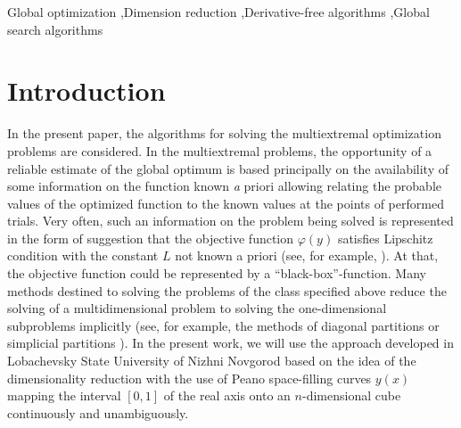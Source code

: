 \documentclass[3p,times,procedia]{elsarticle}
\begin{document}
\begin{frontmatter}
\begin{keyword}
Global optimization \sep Dimension reduction \sep Derivative-free algorithms \sep Global search algorithms




\end{keyword}
\end{frontmatter}





\section{Introduction}
\label{sec:intro}
In the present paper, the algorithms for solving the multiextremal optimization problems
are considered. In the multiextremal problems, the opportunity of a reliable estimate of the global
optimum is based principally on the availability of some information on the function known
{\textit a priori} allowing relating the probable values of the optimized function to the known
values at the points of performed trials. Very often, such an information on the problem being
solved is represented in the form of suggestion that the objective function $\varphi(y)$ satisfies
Lipschitz condition with the constant $L$ not known a priori (see, for example,
\cite{Jones2009,Gablonsky2001,Evtushenko2013}). At that, the objective function could be represented by a ``black-box''-function.
Many methods destined to solving the problems of the class specified above reduce the solving
of a multidimensional problem to solving the one-dimensional subproblems implicitly (see, for
example, the methods of diagonal partitions \cite{Sergeyev2006,SergeyevKvasov2015} or
simplicial partitions \cite{Zilinskas2008,Zilinskas2014}). In the present work, we will use the
approach developed in Lobachevsky State University of Nizhni Novgorod based on the idea of
the dimensionality reduction with the use of Peano space-filling curves $y(x)$ mapping the
interval $[0,1]$ of the real axis onto an $n$-dimensional cube continuously and unambiguously.
\end{document}
